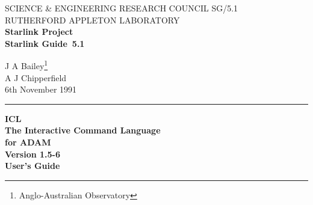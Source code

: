 \pagestyle{myheadings}

\newcommand{\stardoccategory}  {Starlink Guide}
\newcommand{\stardocinitials}  {SG}
\newcommand{\stardocnumber}    {5.1}
\newcommand{\stardocauthors}   {J A Bailey\footnote{Anglo-Australian
Observatory}\\A J Chipperfield}
\newcommand{\stardocdate}      {6th November 1991}
\newcommand{\stardoctitle}     {ICL\\[2.5ex]
                                The Interactive Command Language\\
                                for ADAM}
\newcommand{\stardocversion}   {Version 1.5-6}
\newcommand{\stardocmanual}    {User's Guide}

\newcommand{\stardocname}{\stardocinitials /\stardocnumber}
\renewcommand{\_}{{\tt\char'137}}     %
\markright{\stardocname}
\setlength{\textwidth}{160mm}
\setlength{\textheight}{230mm}
\setlength{\topmargin}{-2mm}
\setlength{\oddsidemargin}{0mm}
\setlength{\evensidemargin}{0mm}
\setlength{\parindent}{0mm}
\setlength{\parskip}{\medskipamount}
\setlength{\unitlength}{1mm}

\renewcommand{\thepage}{\roman{page}}
\renewcommand{\_}{{\tt\char'137}}     %


\thispagestyle{empty}
SCIENCE \& ENGINEERING RESEARCH COUNCIL \hfill \stardocname\\
RUTHERFORD APPLETON LABORATORY\\
{\large\bf Starlink Project\\}
{\large\bf \stardoccategory\ \stardocnumber}
\begin{flushright}
\stardocauthors\\
\stardocdate
\end{flushright}
\vspace{-4mm}
\rule{\textwidth}{0.5mm}
\vspace{5mm}
\begin{center}
{\Huge\bf  \stardoctitle \\ [2.5ex]}
{\LARGE\bf \stardocversion \\ [4ex]}
{\Huge\bf  \stardocmanual}
\end{center}
\vspace{20mm}

